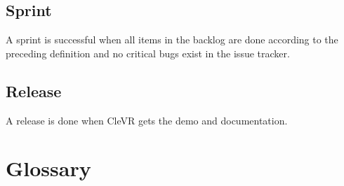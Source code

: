 \documentclass[11pt]{article}
\begin{document}
	\subsection{Sprint}
	A sprint is successful when all items in the backlog are done according to the preceding definition and no critical bugs exist in the issue tracker.

	\subsection{Release}
	A release is done when \gls{CleVR} gets the demo and documentation.

\section{Glossary}
\printglossary[title=]
\end{document}
